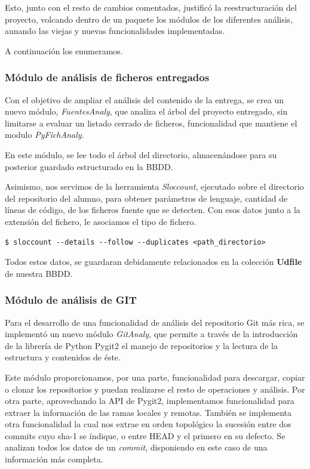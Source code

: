 Esto, junto con el resto de cambios comentados, justificó la reestructuración del proyecto, volcando dentro de un paquete los módulos de los diferentes análisis, aunando las viejas y nuevas funcionalidades implementadas.

A continuación los enumeramos.


\subsubsection{Módulo de análisis de ficheros entregados} 
\label{subsec:mod_anal_fich}

Con el objetivo de ampliar el análisis del contenido de la entrega, se crea un nuevo módulo, \textit{FuentesAnaly}, que analiza el árbol del proyecto entregado, sin limitarse a evaluar un listado cerrado de ficheros, funcionalidad que mantiene el modulo \textit{PyFichAnaly}.


En este módulo, se lee todo el árbol del directorio, almacenándose para su posterior guardado estructurado en la BBDD.


Asimismo, nos servimos de la herramienta \textit{Sloccount}, ejecutado sobre el directorio del repositorio del alumno, para obtener parámetros de lenguaje, cantidad de líneas de código, de los ficheros fuente que se detecten. Con esos datos junto a la extensión del fichero, le asociamos el tipo de fichero.

\begin{center}
\begin{verbatim}
$ sloccount --details --follow --duplicates <path_directorio>
\end{verbatim}
\end{center}


Todos estos datos, se guardaran debidamente relacionados en la colección \textbf{Udfile} de nuestra BBDD.


\subsubsection{Módulo de análisis de GIT} 
\label{subsec:mod_anal_git}

Para el desarrollo de una funcionalidad de análisis del repositorio Git más rica, se implementó un nuevo módulo \textit{GitAnaly}, que permite a través de la introducción de la librería de Python Pygit2 el manejo de repositorios y la lectura de la estructura y contenidos de éste.


Este módulo proporcionamos, por una parte, funcionalidad para descargar, copiar o clonar los repositorios y puedan realizarse el resto de operaciones y análisis. Por otra parte, aprovechando la API de Pygit2, implementamos funcionalidad para extraer la información de las ramas locales y remotas. También se implementa otra funcionalidad la cual nos extrae en orden topológico la sucesión entre dos commits cuyo sha-1 se índique, o entre HEAD y el primero en su defecto. Se analizan todos los datos de un \textit{commit}, disponiendo en este caso de una información más completa.


